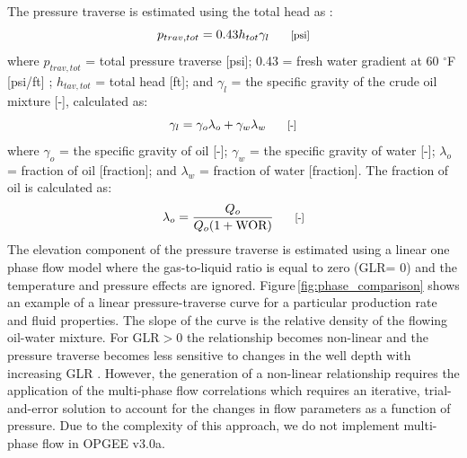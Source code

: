 \documentclass[11pt]{report}
\newcommand{\version}{v3.0a}
\begin{document}
The pressure traverse is estimated using the total head as \cite[Table 1, p. 455]{Mcallister2009}:
\begin{equation} \label{eq:pressure_traverse}
p_{trav,tot} = 0.43 h_{tot} \gamma_{l} \begin{footnotesize} \quad\quad\text{[psi]} \end{footnotesize}
\end{equation}
where $p_{trav,tot}$ = total pressure traverse [psi]; 0.43 = fresh water gradient at 60 $^{\circ}${F} [psi/ft] \cite[p. 25]{Rose1989}; $h_{tav,tot}$ = total head [ft]; and $\gamma_{l}$ = the specific gravity of the crude oil mixture [-], calculated as:
\begin{equation} \label{eq:mixture_gravity}
\gamma_{l}= \gamma_{o}\lambda _{o} + \gamma_{w} \lambda _{w} \begin{footnotesize} \quad\quad\text{[-]} \end{footnotesize}
\end{equation}
where $\gamma_{o}$ = the specific gravity of oil [-]; $\gamma_{w}$ = the specific gravity of water [-]; $\lambda _{o}$ = fraction of oil [fraction]; and $\lambda _{w}$ = fraction of water [fraction]. The fraction of oil is calculated as:
\begin{equation} \label{eq:oil_fraction}
\lambda _{o}= \frac{Q_{o}}{Q_{o}(1+\text{WOR})} \begin{footnotesize} \quad\quad\text{[-]} \end{footnotesize}
\end{equation}
The elevation component of the pressure traverse is estimated using a linear one phase flow model where the gas-to-liquid ratio is equal to zero (GLR= 0) and the temperature and pressure effects are ignored. Figure\,\ref{fig:phase_comparison} shows an example of a linear pressure-traverse curve for a particular production rate and fluid properties. The slope of the curve is the relative density of the flowing oil-water mixture. For GLR$>$0 the relationship becomes non-linear and the pressure traverse becomes less sensitive to changes in the well depth with increasing GLR \cite[p. 27]{Clegg2007}. However, the generation of a non-linear relationship requires the application of the multi-phase flow correlations which requires an iterative, trial-and-error solution to account for the changes in flow parameters as a function of pressure. Due to the complexity of this approach, we do not implement multi-phase flow in OPGEE \version. 
\end{document}
